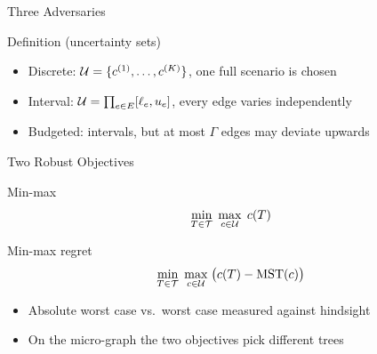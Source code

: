 \documentclass[aspectratio=169,11pt]{beamer}
\begin{document}
\begin{frame}{Three Adversaries}
  \begin{block}{Definition (uncertainty sets)}
    \begin{itemize}
      \item Discrete: $\mathcal{U} = \{c^{(1)}, \ldots, c^{(K)}\}$, one full scenario is chosen
      \item Interval: $\mathcal{U} = \prod_{e \in E} [\ell_e, u_e]$, every edge varies independently
      \item Budgeted: intervals, but at most $\Gamma$ edges may deviate upwards
    \end{itemize}
  \end{block}
\end{frame}

\begin{frame}{Two Robust Objectives}
  \begin{block}{Min-max}
    \[ \min_{T \in \mathcal{T}}\; \max_{c \in \mathcal{U}}\; c(T) \]
  \end{block}
  \begin{block}{Min-max regret}
    \[ \min_{T \in \mathcal{T}}\; \max_{c \in \mathcal{U}}\; \bigl( c(T) - \mathrm{MST}(c) \bigr) \]
  \end{block}
  \begin{itemize}
    \item<2-> Absolute worst case vs.\ worst case measured against hindsight
    \item<3-> On the micro-graph the two objectives pick \alert{different} trees
  \end{itemize}
\end{frame}

\end{document}
